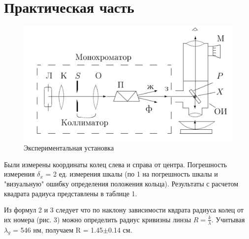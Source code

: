 \documentclass[a4paper, 12pt]{article}
\begin{document}
\section{Практическая часть}
	\begin{figure} 
	\includegraphics[width=\linewidth]{lab}
	\caption{Экспериментальная установка}
	\label{lab}
\end{figure}
Были измерены координаты колец слева и справа от центра. Погрешность измерения $\delta_x$ = 2 ед. измерения шкалы (по 1 на погрешность шкалы и "визуальную" ошибку определения положения кольца). Результаты с расчетом квадрата радиуса представлены в таблице 1.



Из формул 2 и 3 следует что по наклону зависимости квдрата радиуса колец от их номера (рис. 3) можно определить радиус кривизны линзы $R = \frac{k}{ \lambda}$. Учитывая $\lambda_g$ = 546 нм, получаем R = 1.45$\pm$0.14 см.
\end{document}
